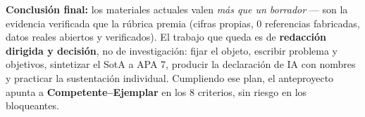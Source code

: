 \begin{tcolorbox}[hallazgo]
\textbf{Conclusión final:} los materiales actuales valen \emph{más que un
borrador} — son la evidencia verificada que la rúbrica premia (cifras propias,
0 referencias fabricadas, datos reales abiertos y verificados). El trabajo que
queda es de \textbf{redacción dirigida y decisión}, no de investigación: fijar
el objeto, escribir problema y objetivos, sintetizar el SotA a APA 7, producir
la declaración de IA con nombres y practicar la sustentación individual.
Cumpliendo ese plan, el anteproyecto apunta a \textbf{Competente--Ejemplar} en
los 8 criterios, sin riesgo en los bloqueantes.
\end{tcolorbox}

